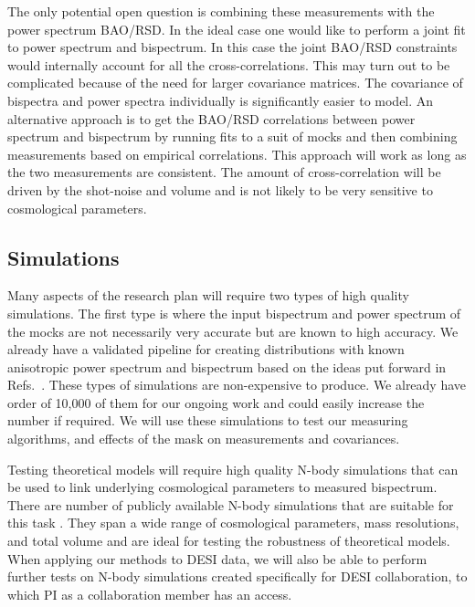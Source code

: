 The only potential open question is combining these measurements with the power
spectrum BAO/RSD. In the ideal case one would like to perform a joint fit to
power spectrum and bispectrum. In this case the joint BAO/RSD constraints would
internally account for all the cross-correlations. This may turn out to be
complicated because of the need for larger covariance matrices. The covariance
of bispectra and power spectra individually is significantly easier to model.
An alternative approach is to get the BAO/RSD correlations between power
spectrum and bispectrum by running fits to a suit of mocks and then combining
measurements based on empirical correlations. This approach will work as long
as the two measurements are consistent. The amount of cross-correlation will
be driven by the shot-noise and volume and is not likely to be very sensitive
to cosmological parameters.

\subsection*{Simulations}

Many aspects of the research plan will require two types of high quality
simulations. The first type is where the input bispectrum and power spectrum of
the mocks are not necessarily very accurate but are known to high accuracy. We
already have a validated pipeline for creating distributions with known
anisotropic power spectrum and bispectrum based on the ideas put forward in
Refs.~\cite{2012PhRvD..85h3002S,2012PhRvD..86l3524R,2010JCAP...10..022W}. These
types of simulations are non-expensive to produce. We already have order of
10,000 of them for our ongoing work and could easily increase the number if
required. We will use these simulations to test our measuring algorithms, and
effects of the mask on measurements and covariances. 

Testing theoretical models will require high quality N-body simulations that
can be used to link underlying cosmological parameters to measured bispectrum.
There are number of publicly available N-body simulations that are suitable for
this task
\cite{2017arXiv171101453K,2005Natur.435..629S,2013AN....334..691R,2016MNRAS.457.4340K,2015JKAS...48..213K,2011JKAS...44..217K,2014arXiv1407.2600S}.
They span a wide range of cosmological parameters, mass resolutions, and total
volume and are ideal for testing the robustness of theoretical models. When
applying our methods to DESI data, we will also be able to perform further
tests on N-body simulations created specifically for DESI collaboration, to
which PI as a collaboration member has an access.

